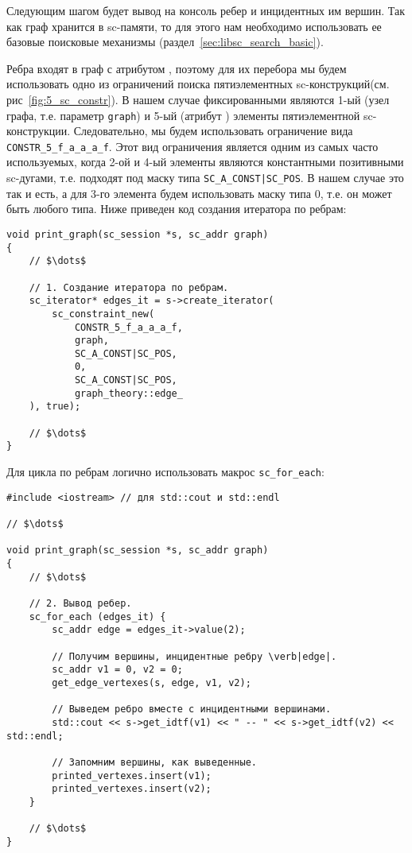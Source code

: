 Следующим шагом будет вывод на консоль ребер и инцидентных им
вершин. Так как граф хранится в sc-памяти, то для этого нам необходимо
использовать ее базовые поисковые механизмы
(раздел~\ref{sec:libsc_search_basic}).

Ребра входят в граф с атрибутом , поэтому для их
перебора мы будем использовать одно из ограничений поиска
пятиэлементных sc-конструкций(см. рис~\ref{fig:5_sc_constr}). В нашем
случае фиксированными являются 1-ый (узел графа, т.е. параметр
\lstinline|graph|) и 5-ый (атрибут ) элементы
пятиэлементной sc-конструкции. Следовательно, мы будем использовать
ограничение вида \lstinline|CONSTR_5_f_a_a_a_f|. Этот вид ограничения
является одним из самых часто используемых, когда 2-ой и 4-ый элементы
являются константными позитивными sc-дугами, т.е. подходят под маску
типа \lstinline+SC_A_CONST|SC_POS+. В нашем случае это так и есть, а
для 3-го элемента будем использовать маску типа 0, т.е. он может быть
любого типа. Ниже приведен код создания итератора по ребрам:
\begin{lstlisting}[texcl]
void print_graph(sc_session *s, sc_addr graph)
{
    // $\dots$

    // 1. Создание итератора по ребрам.
    sc_iterator* edges_it = s->create_iterator(
        sc_constraint_new(
            CONSTR_5_f_a_a_a_f,
            graph,
            SC_A_CONST|SC_POS,
            0,
            SC_A_CONST|SC_POS,
            graph_theory::edge_
    ), true);

    // $\dots$
}
\end{lstlisting}

Для цикла по ребрам логично использовать макрос
\lstinline|sc_for_each|:
\begin{lstlisting}[texcl]
#include <iostream> // для std::cout и std::endl

// $\dots$

void print_graph(sc_session *s, sc_addr graph)
{
    // $\dots$

    // 2. Вывод ребер.
    sc_for_each (edges_it) {
        sc_addr edge = edges_it->value(2);

        // Получим вершины, инцидентные ребру \verb|edge|.
        sc_addr v1 = 0, v2 = 0;
        get_edge_vertexes(s, edge, v1, v2);

        // Выведем ребро вместе с инцидентными вершинами.
        std::cout << s->get_idtf(v1) << " -- " << s->get_idtf(v2) << std::endl;

        // Запомним вершины, как выведенные.
        printed_vertexes.insert(v1);
        printed_vertexes.insert(v2);
    }

    // $\dots$
}
\end{lstlisting}

